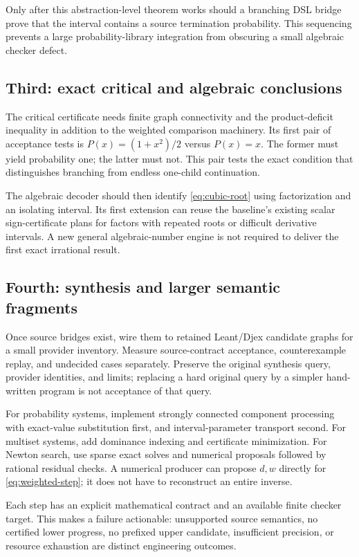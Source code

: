 \documentclass[11pt,a4paper]{article}
\theoremstyle{definition}\newtheorem{definition}[theorem]{Definition}
\theoremstyle{remark}\newtheorem{remark}[theorem]{Remark}
\begin{document}
Only after this abstraction-level theorem works should a branching DSL bridge prove that the interval contains a source termination probability. This sequencing prevents a large probability-library integration from obscuring a small algebraic checker defect.

\subsection{Third: exact critical and algebraic conclusions}
The critical certificate needs finite graph connectivity and the product-deficit inequality in addition to the weighted comparison machinery. Its first pair of acceptance tests is $P(x)=(1+x^2)/2$ versus $P(x)=x$. The former must yield probability one; the latter must not. This pair tests the exact condition that distinguishes branching from endless one-child continuation.

The algebraic decoder should then identify \eqref{eq:cubic-root} using factorization and an isolating interval. Its first extension can reuse the baseline's existing scalar sign-certificate plans for factors with repeated roots or difficult derivative intervals. A new general algebraic-number engine is not required to deliver the first exact irrational result.

\subsection{Fourth: synthesis and larger semantic fragments}
Once source bridges exist, wire them to retained Leant/Djex candidate graphs for a small provider inventory. Measure source-contract acceptance, counterexample replay, and undecided cases separately. Preserve the original synthesis query, provider identities, and limits; replacing a hard original query by a simpler hand-written program is not acceptance of that query.

For probability systems, implement strongly connected component processing with exact-value substitution first, and interval-parameter transport second. For multiset systems, add dominance indexing and certificate minimization. For Newton search, use sparse exact solves and numerical proposals followed by rational residual checks. A numerical producer can propose $d,w$ directly for \eqref{eq:weighted-step}; it does not have to reconstruct an entire inverse.

Each step has an explicit mathematical contract and an available finite checker target. This makes a failure actionable: unsupported source semantics, no certified lower progress, no prefixed upper candidate, insufficient precision, or resource exhaustion are distinct engineering outcomes.
\end{document}
